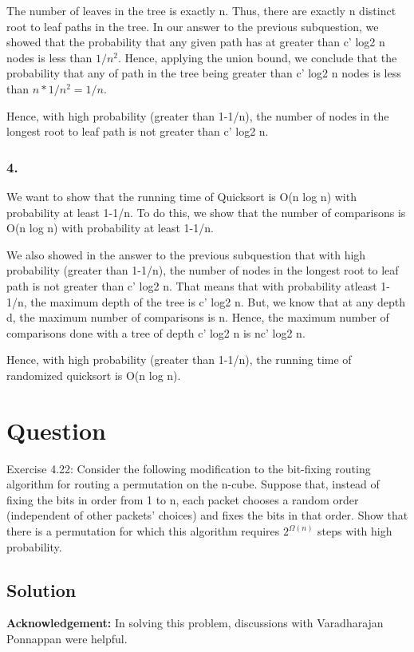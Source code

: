 \documentclass[10pt]{article}
\begin{document}
The number of leaves in the tree is exactly n. Thus, there are exactly n distinct root to leaf paths in the tree. In our answer to the previous subquestion, we showed that the probability that any given path has at greater than c' log2 n nodes is less than $1/n^{2}$. Hence, applying the union bound, we conclude that the probability that any of path in the tree being greater than c' log2 n nodes is less than $n*1/n^{2}=1/n$.

Hence, with high probability (greater than 1-1/n), the number of nodes in the longest root to leaf path is not greater than c' log2 n.

\subsubsection{4.}

We want to show that the running time of Quicksort is O(n log n) with probability at least 1-1/n. To do this, we show that the number of comparisons is O(n log n) with probability at least 1-1/n.

We also showed in the answer to the previous subquestion that with high probability (greater than 1-1/n), the number of nodes in the longest root to leaf path is not greater than c' log2 n. That means that with probability atleast 1-1/n, the maximum depth of the tree is c' log2 n. But, we know that at any depth d, the maximum number of comparisons is n. Hence, the maximum number of comparisons done with a tree of depth c' log2 n is nc' log2 n.

Hence, with high probability (greater than 1-1/n), the running time of randomized quicksort is O(n log n).

\section{Question}
Exercise 4.22: Consider the following modification to the bit-fixing routing algorithm for routing a permutation on the n-cube. Suppose that, instead of fixing the bits in order from 1 to n, each packet chooses a random order (independent of other packets' choices) and fixes the bits in that order. Show that there is a permutation for which this algorithm requires $2^{\Omega(n)}$ steps with high probability.

\subsection{Solution}

\textbf{Acknowledgement:} In solving this problem, discussions with Varadharajan Ponnappan were helpful.
\end{document}
